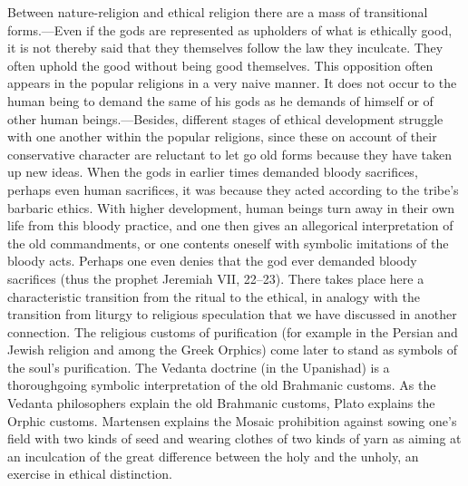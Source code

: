 \documentclass[12pt,a4paper]{book}
\newcommand{\opage}[1]{\marginnote{\footnotesize\textit{[#1]}}}
\begin{document}
Between nature-religion and ethical religion there are a mass of transitional forms.---Even if the gods
are represented as upholders of what is ethically good, it is not thereby said that they themselves
follow the law they inculcate. They often uphold the good without being good themselves. This opposition
often appears in the popular religions in a very naive manner. It does not occur to the human being to
demand the same of his gods as he demands of himself or of other human beings.---Besides, different
stages of ethical development struggle with one another within the popular religions, since these on
account of their conservative character are reluctant to let go old forms because they have taken up new
ideas. When the gods in earlier times demanded bloody sacrifices, perhaps even human sacrifices, it was
because they acted according to the tribe's barbaric ethics. With higher development, human beings turn
away in their own life from this bloody practice, and one then gives an allegorical interpretation of the
old commandments, or one contents oneself with symbolic imitations of the bloody acts. Perhaps one even
denies that the god ever demanded bloody sacrifices (thus the prophet Jeremiah VII, 22--23). There takes
place here a characteristic transition from the ritual to the ethical, in analogy with the transition from
liturgy to religious speculation that we have discussed in another connection. The religious customs of
purification (for example in the Persian and Jewish religion and among the Greek Orphics) 
\opage{213}come later to
stand as symbols of the soul's purification. The Vedanta doctrine (in the Upanishad) is a thoroughgoing
symbolic interpretation of the old Brahmanic customs. As the Vedanta philosophers explain the old
Brahmanic customs, Plato explains the Orphic customs. Martensen explains the Mosaic prohibition against
sowing one's field with two kinds of seed and wearing clothes of two kinds of yarn as aiming at an
inculcation of the great difference between the holy and the unholy, an exercise in ethical distinction.
\end{document}
